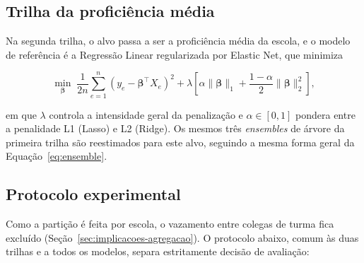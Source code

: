 \subsection{Trilha da proficiência média}

Na segunda trilha, o alvo passa a ser a proficiência média da escola, e o
modelo de referência é a Regressão Linear regularizada por Elastic Net, que
minimiza

\begin{equation}
    \min_{\boldsymbol{\beta}} \; \frac{1}{2n} \sum_{e=1}^{n} \left(y_e - \boldsymbol{\beta}^\top X_e\right)^2 + \lambda \left[\alpha \lVert \boldsymbol{\beta} \rVert_1 + \frac{1-\alpha}{2} \lVert \boldsymbol{\beta} \rVert_2^2\right],
    \label{eq:elasticnet}
\end{equation}

em que $\lambda$ controla a intensidade geral da penalização e $\alpha \in
[0,1]$ pondera entre a penalidade L1 (Lasso) e L2 (Ridge). Os mesmos três
\textit{ensembles} de árvore da primeira trilha são reestimados para este
alvo, seguindo a mesma forma geral da Equação~\ref{eq:ensemble}.

\subsection{Protocolo experimental}
\label{sec:protocolo}

Como a partição é feita por escola, o vazamento entre colegas de turma fica
excluído (Seção~\ref{sec:implicacoes-agregacao}). O protocolo abaixo, comum
às duas trilhas e a todos os modelos, separa estritamente decisão de
avaliação:

